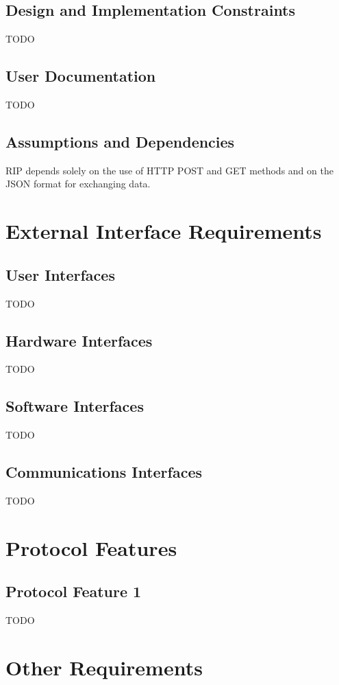 \section{Design and Implementation Constraints}
TODO

\section{User Documentation}
TODO

\section{Assumptions and Dependencies}
RIP depends solely on the use of HTTP POST and GET methods and on the JSON format for exchanging data.


\chapter{External Interface Requirements}
\label{External Interface Requirements}

\section{User Interfaces}
TODO

\section{Hardware Interfaces}
TODO

\section{Software Interfaces}
TODO

\section{Communications Interfaces}
TODO


\chapter{Protocol Features}
\label{System Features}

\section{Protocol Feature 1}
TODO


\chapter{Other Requirements}
\label{Other Requirements}




